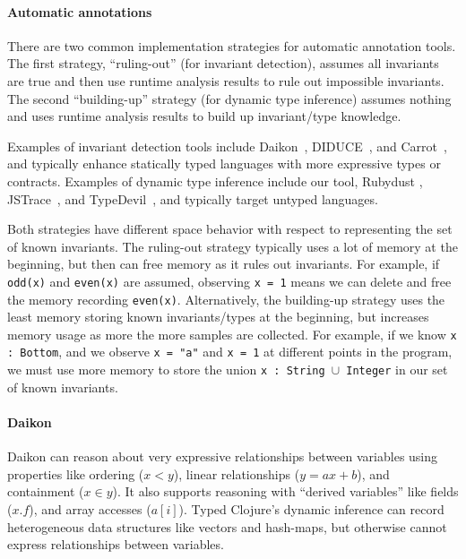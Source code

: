 \paragraph{Automatic annotations}
There are two common implementation strategies for automatic annotation tools. The first
strategy, ``ruling-out'' (for invariant detection), assumes all invariants are true 
and then use runtime analysis results to rule out
impossible invariants. The second ``building-up'' strategy (for dynamic type inference)
assumes nothing and uses runtime analysis results to build up invariant/type knowledge.

Examples of invariant detection tools include Daikon~\cite{ernst2001dynamically},
DIDUCE~\cite{hangal2002tracking}, and Carrot~\cite{pytlik2003automated}, and
typically enhance statically typed languages with more expressive types or contracts.
Examples of dynamic type inference include our tool, Rubydust \cite{An10dynamicinference},
JSTrace~\cite{saftoiu2010jstrace}, and TypeDevil~\cite{pradel2015typedevil},
and typically target untyped languages.

Both strategies have different space behavior with respect to representing
the set of known invariants.
The ruling-out strategy typically uses a lot of memory at the beginning,
but then can free memory as it rules out invariants. For example, if
\texttt{odd(x)} and \texttt{even(x)} are assumed, observing \texttt{x = 1}
means we can delete and free the memory recording \texttt{even(x)}.
Alternatively, the building-up strategy uses the least memory storing
known invariants/types at the beginning, but increases memory usage
as more the more samples are collected. For example, if we know
\texttt{x : Bottom}, and we observe \texttt{x = "a"} and \texttt{x = 1}
at different points in the program, we must use more memory to
store the union \texttt{x : String $\cup$ Integer} in our set of known invariants.

\paragraph{Daikon}
Daikon can reason about very expressive relationships between variables
using properties like ordering ($x < y$), linear relationships ($y = ax + b$),
and containment ($x \in y$). It also supports reasoning with ``derived variables''
like fields ($x.f$), and array accesses ($a[i]$).
%
Typed Clojure's dynamic inference can record heterogeneous data structures
like vectors and hash-maps, but otherwise cannot express relationships
between variables.

